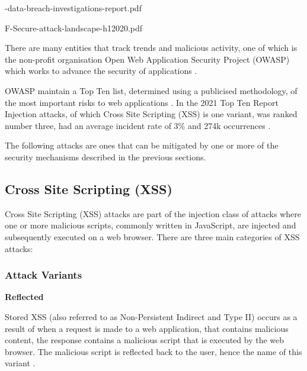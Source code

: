 \documentclass{mscreport}
\begin{document}
\vspace{0.3cm} 

\vspace{0.3cm} -data-breach-investigations-report.pdf

\vspace{0.3cm} \noindent
F-Secure-attack-landscape-h12020.pdf

\vspace{0.3cm} \noindent
{}

\vspace{0.3cm} \noindent
There are many entities that track trends and malicious activity, one of which is the non-profit organisation Open Web Application Security Project (OWASP) which works to advance the security of applications \cite{noauthor_undated-ta,Kellezi2021-nd}.

\vspace{0.3cm} \noindent
OWASP maintain a Top Ten list, determined using a publicised methodology, of the most important risks to web applications \cite{Kellezi2021-nd,noauthor_undated-kz}. In the 2021 Top Ten Report Injection attacks, of which Cross Site Scripting (XSS) is one variant, was ranked number three, had an average incident rate of 3\% and 274k occurrences \cite{noauthor_undated-gt}.

\vspace{0.3cm} \noindent
The following attacks are ones that can be mitigated by one or more of the security mechanisms described in the previous sections.

\subsection{Cross Site Scripting (XSS)}
Cross Site Scripting (XSS) attacks are part of the injection class of attacks where one or more malicious scripts, commonly written in JavaScript, are injected and subsequently executed on a web browser. There are three main categories of XSS attacks:

\subsubsection{Attack Variants}
\textbf{Reflected}

\vspace{0.2cm} \noindent
Stored XSS (also referred to as Non-Persistent Indirect and Type II) occurs as a result of when a request is made to a web application, that contains malicious content, the response contains a malicious script that is executed by the web browser. The malicious script is reflected back to the user, hence the name of this variant \cite{Rodriguez2020-bg}.
\end{document}
